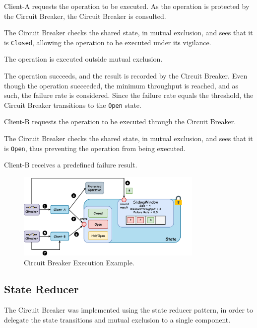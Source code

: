 \begin{boldenumerate}
    \item Client-A requests the operation to be executed.
    As the operation is protected by the Circuit Breaker, the Circuit Breaker is consulted.
    \item The Circuit Breaker checks the shared state, in mutual exclusion,
    and sees that it is \texttt{Closed}, allowing the operation to be executed under its vigilance.
    \item The operation is executed outside mutual exclusion.
    \item The operation succeeds, and the result is recorded by the Circuit Breaker.
    Even though the operation succeeded, the minimum throughput is reached,
    and as such, the failure rate is considered.
    Since the failure rate equals the threshold, the Circuit Breaker transitions to the \texttt{Open} state.
    \item Client-B requests the operation to be executed through the Circuit Breaker.
    \item The Circuit Breaker checks the shared state, in mutual exclusion, and sees that it is \texttt{Open}, thus preventing the operation from being executed.
    \item Client-B receives a predefined failure result.
\end{boldenumerate}

\begin{figure}[!htb]
    \centering
    \includegraphics[width=0.8\textwidth]{../figures/05_cbreaker-execution-example}
    \caption{Circuit Breaker Execution Example.}
    \label{fig:circuit-breaker-execution-example}
\end{figure}

\subsection{State Reducer}\label{subsec:cbreaker-state-reducer}

The Circuit Breaker was implemented using the state reducer pattern,
in order to delegate the state transitions and mutual exclusion to a single component.

